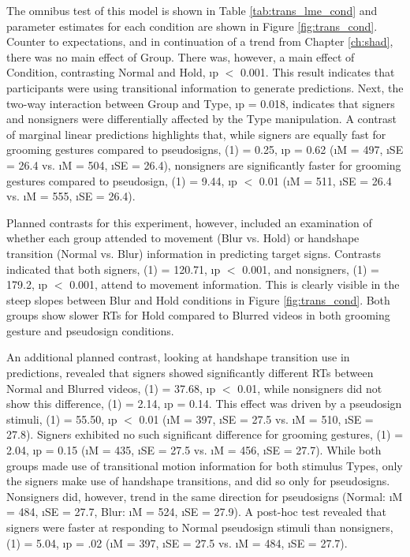             The omnibus test of this model is shown in Table \ref{tab:trans_lme_cond} and parameter estimates for each condition are shown in Figure \ref{fig:trans_cond}. Counter to expectations, and in continuation of a trend from Chapter \ref{ch:shad}, there was no main effect of Group. There was, however, a main effect of Condition, contrasting Normal and Hold, \i{p} $<$ 0.001. This result indicates that participants were using transitional information to generate predictions. Next, the two-way interaction between Group and Type, \i{p} = 0.018, indicates that signers and nonsigners were differentially affected by the Type manipulation. A contrast of marginal linear predictions highlights that, while signers are equally fast for grooming gestures compared to pseudosigns, \chsq(1) = 0.25, \i{p} = 0.62 (\i{M} = 497, \i{SE} = 26.4 vs.  \i{M} = 504,   \i{SE} = 26.4), nonsigners are significantly faster for grooming gestures compared to pseudosign, \chsq(1) = 9.44, \i{p} $<$ 0.01 (\i{M} = 511, \i{SE} = 26.4 vs. \i{M} = 555,   \i{SE} = 26.4).\par
            Planned contrasts for this experiment, however, included an examination of whether each group attended to movement (Blur vs. Hold) or handshape transition (Normal vs. Blur) information in predicting target signs. Contrasts indicated that both signers, \chsq(1) = 120.71, \i{p} $<$ 0.001, and nonsigners, \chsq(1) = 179.2, \i{p} $<$ 0.001, attend to movement information. This is clearly visible in the steep slopes between Blur and Hold conditions in Figure \ref{fig:trans_cond}. Both groups show slower RTs for Hold compared to Blurred videos in both grooming gesture and pseudosign conditions. \par
            An additional planned contrast, looking at handshape transition use in predictions, revealed that signers showed significantly different RTs between Normal and Blurred videos, \chsq(1) = 37.68, \i{p} $<$ 0.01, while nonsigners did not show this difference, \chsq(1) = 2.14, \i{p}  = 0.14. This effect was driven by a     pseudosign stimuli, \chsq(1) = 55.50, \i{p}  $<$ 0.01 (\i{M} = 397, \i{SE} = 27.5 vs. \i{M} = 510, \i{SE} = 27.8). Signers exhibited no such significant difference for grooming gestures, \chsq(1) = 2.04, \i{p}  = 0.15 (\i{M} = 435, \i{SE} = 27.5 vs. \i{M} = 456, \i{SE} = 27.7). While both groups made use of transitional motion information for both stimulus Types, only the signers make use of handshape transitions, and did so only for pseudosigns. Nonsigners did, however, trend in the same direction for pseudosigns (Normal: \i{M} = 484, \i{SE} = 27.7, Blur: \i{M} = 524, \i{SE} = 27.9). A post-hoc test revealed that signers were faster at responding to Normal pseudosign stimuli than nonsigners, \chsq(1) = 5.04, \i{p} = .02 (\i{M} = 397, \i{SE} = 27.5 vs. \i{M} = 484, \i{SE} = 27.7).\par
